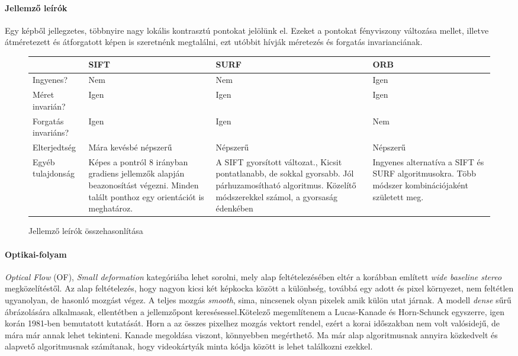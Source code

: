 \documentclass[12pt,a4paper,oneside]{report} %
\begin{document}
\paragraph{Jellemző leírók}
Egy képből jellegzetes, többnyire nagy lokális kontrasztú pontokat jelölünk el. Ezeket a pontokat fényviszony változása mellet, illetve átméretezett és átforgatott képen is szeretnénk megtalálni, ezt utóbbit hívják méretezés és forgatás invarianciának.
\begin{figure}[H]
	\centering
	\begin{tabular}{s|p{3.5cm}|p{3.5cm}|p{3.5cm} }
		& SIFT \cite{lowe2004distinctive} & SURF \cite{bay2006surf} &  ORB \cite{rublee2011orb} \\
		\hline
		Ingyenes? & Nem & Nem & Igen \\
		Méret invarián? & Igen & Igen & Igen \\
		Forgatás invariáns? & Igen & Igen & Nem \\
		Elterjedtség & Mára kevésbé népszerű & Népszerű & Népszerű \\
		Egyéb tulajdonság 
		& Képes a pontról 8 irányban gradiens jellemzők alapján beazonosítást végezni.
		Minden talált ponthoz egy orientációt is meghatároz. 
		& A SIFT gyorsított változat., Kicsit pontatlanabb, de sokkal gyorsabb. Jól párhuzamosítható algoritmus. Közelítő módszerekkel számol, a gyorsaság édenkében 
		& Ingyenes alternatíva a SIFT és SURF algoritmusokra. Több módszer kombinációjaként született meg.\\
	
	\end{tabular}
	\caption{Jellemző leírók összehasonlítása}
\end{figure}


\paragraph{Optikai-folyam}
\textit{Optical Flow} (OF), \textit{Small deformation} kategóriába lehet sorolni, mely alap feltételezésében eltér a korábban említett \textit{wide baseline stereo} megközelítéstől. Az alap feltételezés, hogy nagyon kicsi két képkocka között a különbség, továbbá egy adott és pixel környezet, nem feltétlen ugyanolyan, de hasonló  mozgást végez. A teljes mozgás \textit{smooth}, sima, nincsenek olyan pixelek amik külön utat járnak.  A modell \textit{dense} sűrű ábrázolására alkalmasak, ellentétben a jellemzőpont keresésessel.Kötelező megemlítenem a Lucas-Kanade \cite{lucas1981iterative} és Horn-Schunck \cite{horn1981determining} egyszerre, igen korán 1981-ben bemutatott kutatását. Horn a az összes pixelhez  mozgás vektort rendel, ezért a korai időszakban nem volt valósidejű, de mára már annak lehet tekinteni. Kanade megoldása viszont, könnyebben megérthető. Ma már alap algoritmusnak annyira közkedvelt és alapvető algoritmusnak számítanak, hogy videokártyák minta kódja között is lehet találkozni ezekkel.
 
\end{document}
